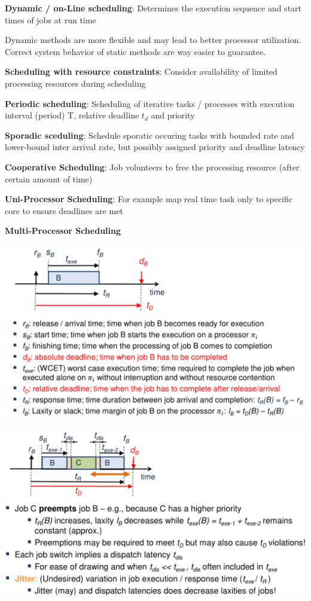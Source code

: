 \documentclass[english]{latex4ei/latex4ei_sheet}
\begin{document}
\textbf{Dynamic / on-Line scheduling}: Determines the execution sequence and
start times of jobs at run time

Dynamic methods are more flexible and may lead to better processor utilization. Correct system behavior of static methods are way easier to guarantee.

\textbf{Scheduling with resource constraints}: Consider availability of limited processing resources during scheduling

\textbf{Periodic scheduling}: Scheduling of iterative tasks / processes with execution interval (period) T, relative deadline $t_d$ and priority

\textbf{Sporadic sceduling}: Schedule sporatic occuring tasks with bounded rate and lower-bound inter arrival rate, but possibly assigned priority and deadline
latency

\textbf{Cooperative Scheduling}: Job volunteers to free the processing resource (after certain amount of time)

\textbf{Uni-Processor Scheduling}: For example map real time task only to specific core to ensure deadlines are met

\textbf{Multi-Processor Scheduling}


\begin{center}
  \centering
  \includegraphics[width=\linewidth]{assets/RealTimeParameters.png}
  \label{fig:realtimeparameters}
\end{center}

\begin{center}
  \centering
  \includegraphics[width=\linewidth]{assets/RealTimeParameters2.png}
  \label{fig:realtimeparameters2}
\end{center}
\end{document}
